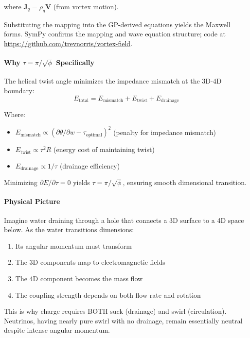 where $\mathbf{J}_q = \rho_q \mathbf{V}$ (from vortex motion).

Substituting the mapping into the GP-derived equations yields the Maxwell forms. SymPy confirms the mapping and wave equation structure; code at \url{https://github.com/trevnorris/vortex-field}.

\paragraph{Why $\tau = \pi/\sqrt{\phi}$ Specifically}

The helical twist angle minimizes the impedance mismatch at the 3D-4D boundary:
\begin{equation}
E_{\text{total}} = E_{\text{mismatch}} + E_{\text{twist}} + E_{\text{drainage}}
\end{equation}

Where:
\begin{itemize}
\item $E_{\text{mismatch}} \propto (\partial \theta / \partial w - \tau_{\text{optimal}})^2$  (penalty for impedance mismatch)
\item $E_{\text{twist}} \propto \tau^2 R$  (energy cost of maintaining twist)
\item $E_{\text{drainage}} \propto 1/\tau$  (drainage efficiency)
\end{itemize}

Minimizing $\partial E / \partial \tau = 0$ yields $\tau = \pi/\sqrt{\phi}$, ensuring smooth dimensional transition.

\paragraph{Physical Picture}

Imagine water draining through a hole that connects a 3D surface to a 4D space below. As the water transitions dimensions:
\begin{enumerate}
\item Its angular momentum must transform
\item The 3D components map to electromagnetic fields
\item The 4D component becomes the mass flow
\item The coupling strength depends on both flow rate and rotation
\end{enumerate}

This is why charge requires BOTH suck (drainage) and swirl (circulation). Neutrinos, having nearly pure swirl with no drainage, remain essentially neutral despite intense angular momentum.

